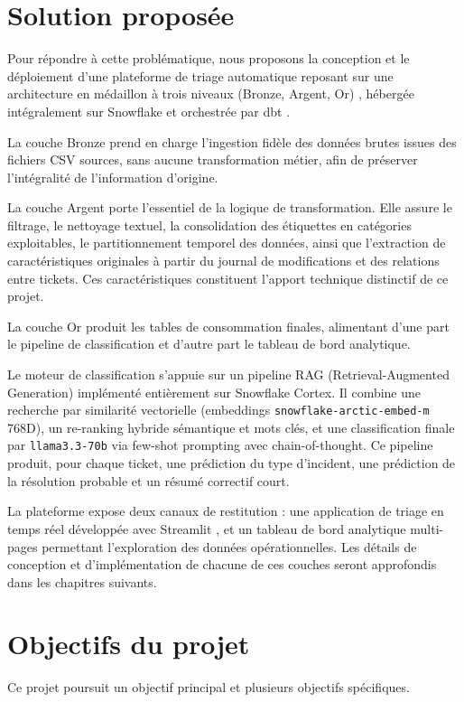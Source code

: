 \section{Solution proposée}
Pour répondre à cette problématique, nous proposons la conception et le déploiement d'une plateforme de triage automatique reposant sur une architecture en médaillon à trois niveaux (Bronze, Argent, Or) \cite{logo:medallion}, hébergée intégralement sur Snowflake \cite{logo:snowflake} et orchestrée par dbt \cite{logo:dbt}.

La couche Bronze prend en charge l'ingestion fidèle des données brutes issues des fichiers CSV sources, sans aucune transformation métier, afin de préserver l'intégralité de l'information d'origine.

La couche Argent porte l'essentiel de la logique de transformation. Elle assure le filtrage, le nettoyage textuel, la consolidation des étiquettes en catégories exploitables, le partitionnement temporel des données, ainsi que l'extraction de caractéristiques originales à partir du journal de modifications et des relations entre tickets. Ces caractéristiques constituent l'apport technique distinctif de ce projet.

La couche Or produit les tables de consommation finales, alimentant d'une part le pipeline de classification et d'autre part le tableau de bord analytique.

Le moteur de classification s'appuie sur un pipeline RAG (Retrieval-Augmented Generation) implémenté entièrement sur Snowflake Cortex. Il combine une recherche par similarité vectorielle (embeddings \texttt{snowflake-arctic-embed-m} 768D), un re-ranking hybride sémantique et mots clés, et une classification finale par \texttt{llama3.3-70b} via few-shot prompting avec chain-of-thought. Ce pipeline produit, pour chaque ticket, une prédiction du type d'incident, une prédiction de la résolution probable et un résumé correctif court.

La plateforme expose deux canaux de restitution : une application de triage en temps réel développée avec Streamlit \cite{logo:streamlit}, et un tableau de bord analytique multi-pages permettant l'exploration des données opérationnelles. Les détails de conception et d'implémentation de chacune de ces couches seront approfondis dans les chapitres suivants.

\section{Objectifs du projet}
Ce projet poursuit un objectif principal et plusieurs objectifs spécifiques.

